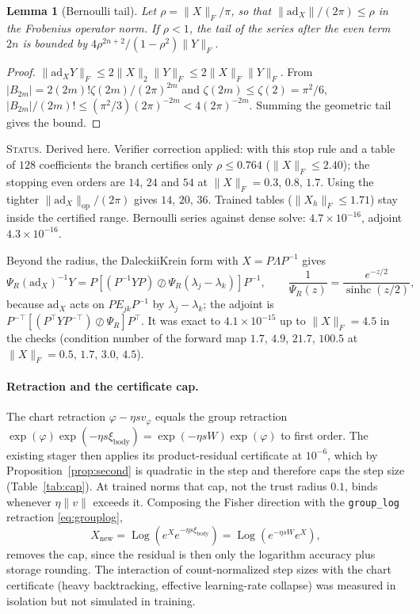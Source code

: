 \documentclass[11pt]{article}
\newtheorem{lemma}[theorem]{Lemma}
\theoremstyle{definition}
\theoremstyle{remark}
\newcommand{\ad}{\mathrm{ad}}
\newcommand{\Log}{\operatorname{Log}}
\newcommand{\ndash}{\textendash}
\newcommand{\status}[1]{\par\smallskip\noindent\textsc{Status.} #1\par\smallskip}
\begin{document}
\begin{lemma}[Bernoulli tail]\label{lem:bernoulli}
Let $\rho=\|X\|_F/\pi$, so that $\|\ad_X\|/(2\pi)\le\rho$ in the Frobenius operator norm. If $\rho<1$, the tail of the series after the even term $2n$ is bounded by $4\rho^{2n+2}/(1-\rho^2)\|Y\|_F$.
\end{lemma}
\begin{proof}
$\|\ad_XY\|_F\le2\|X\|_2\|Y\|_F\le2\|X\|_F\|Y\|_F$. From $|B_{2m}|=2(2m)!\zeta(2m)/(2\pi)^{2m}$ and $\zeta(2m)\le\zeta(2)=\pi^2/6$, $|B_{2m}|/(2m)!\le(\pi^2/3)(2\pi)^{-2m}<4(2\pi)^{-2m}$. Summing the geometric tail gives the bound.
\end{proof}
\status{Derived here. Verifier correction applied: with this stop rule and a table of $128$ coefficients the branch certifies only $\rho\le0.764$ ($\|X\|_F\le2.40$); the stopping even orders are $14$, $24$ and $54$ at $\|X\|_F=0.3$, $0.8$, $1.7$. Using the tighter $\|\ad_X\|_{\mathrm{op}}/(2\pi)$ gives $14$, $20$, $36$. Trained tables ($\|X_h\|_F\le1.71$) stay inside the certified range. Bernoulli series against dense solve: $4.7\times10^{-16}$, adjoint $4.3\times10^{-16}$.}

Beyond the radius, the Daleckii\ndash Krein form \cite[Ch.~3]{Higham2008} with $X=P\Lambda P^{-1}$ gives
\begin{equation}\label{eq:dk}
\Psi_R(\ad_X)^{-1}Y=P\left[(P^{-1}YP)\oslash\Psi_R(\lambda_j-\lambda_k)\right]P^{-1},\qquad \frac{1}{\Psi_R(z)}=\frac{e^{-z/2}}{\operatorname{sinhc}(z/2)},
\end{equation}
because $\ad_X$ acts on $PE_{jk}P^{-1}$ by $\lambda_j-\lambda_k$; the adjoint is $P^{-\top}[(P^\top YP^{-\top})\oslash\Psi_R]P^\top$. It was exact to $4.1\times10^{-15}$ up to $\|X\|_F=4.5$ in the checks (condition number of the forward map $1.7$, $4.9$, $21.7$, $100.5$ at $\|X\|_F=0.5$, $1.7$, $3.0$, $4.5$).

\paragraph{Retraction and the certificate cap.} The chart retraction $\varphi-\eta sv_\varphi$ equals the group retraction $\exp(\varphi)\exp(-\eta s\xi_{\mathrm{body}})=\exp(-\eta sW)\exp(\varphi)$ to first order. The existing stager then applies its product-residual certificate at $10^{-6}$, which by Proposition~\ref{prop:second} is quadratic in the step and therefore caps the step size (Table~\ref{tab:cap}). At trained norms that cap, not the trust radius $0.1$, binds whenever $\eta\|v\|$ exceeds it. Composing the Fisher direction with the \texttt{group\_log} retraction \eqref{eq:grouplog},
\begin{equation}\label{eq:fisher-grouplog}
X_{\mathrm{new}}=\Log\left(e^{X}e^{-\eta s\xi_{\mathrm{body}}}\right)=\Log\left(e^{-\eta sW}e^{X}\right),
\end{equation}
removes the cap, since the residual is then only the logarithm accuracy plus storage rounding. The interaction of count-normalized step sizes with the chart certificate (heavy backtracking, effective learning-rate collapse) was measured in isolation but not simulated in training.
\end{document}
